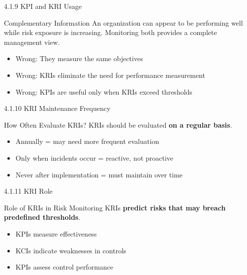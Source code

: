 \documentclass{beamer}
\begin{document}
	\begin{frame}{4.1.9 KPI and KRI Usage}
		\begin{block}{Complementary Information}
			An organization can appear to be performing well while risk exposure is increasing. Monitoring both provides a complete management view.
		\end{block}
		\begin{itemize}
			\item Wrong: They measure the same objectives
			\item Wrong: KRIs eliminate the need for performance measurement
			\item Wrong: KPIs are useful only when KRIs exceed thresholds
		\end{itemize}
	\end{frame}
	
	\begin{frame}{4.1.10 KRI Maintenance Frequency}
		\begin{block}{How Often Evaluate KRIs?}
			KRIs should be evaluated \textbf{on a regular basis}.
		\end{block}
		\begin{itemize}
			\item Annually = may need more frequent evaluation
			\item Only when incidents occur = reactive, not proactive
			\item Never after implementation = must maintain over time
		\end{itemize}
	\end{frame}
	
	\begin{frame}{4.1.11 KRI Role}
		\begin{block}{Role of KRIs in Risk Monitoring}
			KRIs \textbf{predict risks that may breach predefined thresholds}.
		\end{block}
		\begin{itemize}
			\item KPIs measure effectiveness
			\item KCIs indicate weaknesses in controls
			\item KPIs assess control performance
		\end{itemize}
	\end{frame}
	
\end{document}
